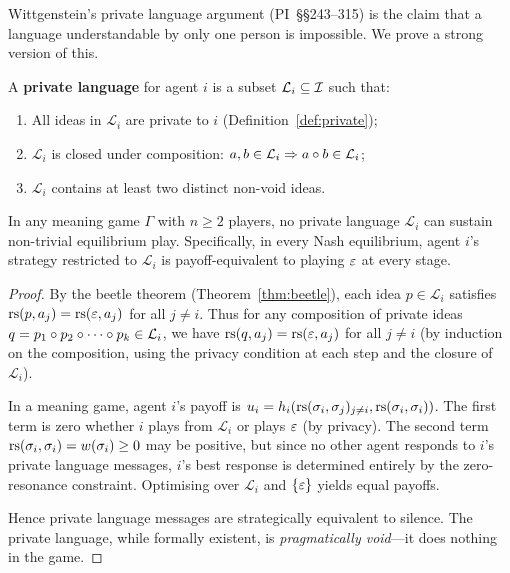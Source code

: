 Wittgenstein's private language argument (PI~\S\S243--315) is
the claim that a language understandable by only one person is
impossible.  We prove a strong version of this.

\begin{definition}
\label{def:private-language}
A \textbf{private language} for agent $i$ is a subset $\mathcal{L}_i
\subseteq \mathcal{I}$ such that:
\begin{enumerate}[label=(\roman*)]
  \item All ideas in $\mathcal{L}_i$ are private to $i$ (Definition~\ref{def:private});
  \item $\mathcal{L}_i$ is closed under composition:
    $a, b \in \mathcal{L}_i \Rightarrow a \circ b \in \mathcal{L}_i$;
  \item $\mathcal{L}_i$ contains at least two distinct non-void ideas.
\end{enumerate}
\end{definition}

\begin{theorem}
\label{thm:private-language}
In any meaning game $\Gamma$ with $n \ge 2$ players, no private
language $\mathcal{L}_i$ can sustain non-trivial equilibrium play.
Specifically, in every Nash equilibrium, agent $i$'s strategy
restricted to $\mathcal{L}_i$ is payoff-equivalent to playing
$\varepsilon$ at every stage.
\end{theorem}

\begin{proof}
By the beetle theorem (Theorem~\ref{thm:beetle}), each idea
$p \in \mathcal{L}_i$ satisfies $\mathrm{rs}(p, a_j) = \mathrm{rs}(\varepsilon, a_j)$
for all $j \ne i$.  Thus for any composition of private ideas
$q = p_1 \circ p_2 \circ \cdots \circ p_k \in \mathcal{L}_i$,
we have $\mathrm{rs}(q, a_j) = \mathrm{rs}(\varepsilon, a_j)$ for all $j \ne i$
(by induction on the composition, using the privacy condition
at each step and the closure of $\mathcal{L}_i$).

In a meaning game, agent $i$'s payoff is
$u_i = h_i(\mathrm{rs}(\sigma_i, \sigma_j)_{j \ne i}, \mathrm{rs}(\sigma_i, \sigma_i))$.
The first term is zero whether $i$ plays from $\mathcal{L}_i$ or
plays $\varepsilon$ (by privacy).  The second term $\mathrm{rs}(\sigma_i, \sigma_i)
= w(\sigma_i) \ge 0$ may be positive, but since no other agent
responds to $i$'s private language messages, $i$'s best response
is determined entirely by the zero-resonance constraint.
Optimising over $\mathcal{L}_i$ and $\{\varepsilon\}$ yields equal payoffs.

Hence private language messages are strategically equivalent to
silence.  The private language, while formally existent, is
\emph{pragmatically void}---it does nothing in the game.
\end{proof}

